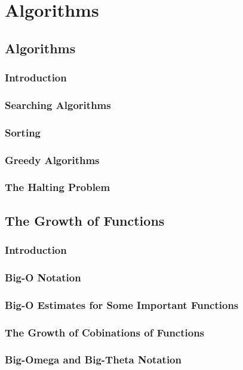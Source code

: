 \documentclass[11pt]{book}
\begin{document}
 
\chapter{Algorithms}
 \section{Algorithms}
  \subsection{Introduction}
  \subsection{Searching Algorithms}
  \subsection{Sorting}
  \subsection{Greedy Algorithms}
  \subsection{The Halting Problem}
  
 \section{The Growth of Functions}
  \subsection{Introduction}
  \subsection{Big-O Notation}
  \subsection{Big-O Estimates for Some Important Functions}
  \subsection{The Growth of Cobinations of Functions}
  \subsection{Big-Omega and Big-Theta Notation}
  
\end{document}
